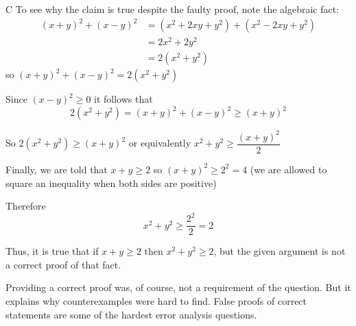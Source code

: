 \documentclass[11pt,a4paper]{article}
\begin{document}
\begin{enumerate}[label=\textbf{\arabic*.},leftmargin=*,itemsep=0pt,start=1]
\begin{djsSolution}{C}
To see why the claim is true despite the faulty proof, note the algebraic fact:
\begin{align*}
(x+y)^2+(x-y)^2 &= (x^2 + 2xy + y^2) + (x^2-2xy+y^2)\\
                &= 2x^2 + 2y^2 \\
                &= 2(x^2+y^2)
\end{align*}
so \((x+y)^2+(x-y)^2 = 2(x^2+y^2)\)

Since \((x-y)^2\geq0\) it follows that 
\[
2(x^2+y^2) =(x+y)^2+(x-y)^2 \geq (x+y)^2
\]

So \(2(x^2+y^2)\geq(x+y)^2\) or equivalently \(x^2+y^2\geq\dfrac{(x+y)^2}{2}\)

Finally, we are told that \(x+y\geq2\) so \((x+y)^2\geq2^2=4\) (we are allowed to square an inequality when both sides are positive)

Therefore
\[x^2+y^2\geq \dfrac{2^2}{2}=2\]

Thus, it is true that if $x+y\geq2$ then $x^2+y^2\geq2$, but the given argument is not a correct proof of that fact. 

Providing a correct proof was, of course, not a requirement of the question. But it explains why counterexamples were hard to find. False proofs of correct statements are some of the hardest error analysis questions.
\end{djsSolution}
\end{enumerate}
\clearpage
\thispagestyle{djssolutions}
\vspace*{8pt}
\end{document}
